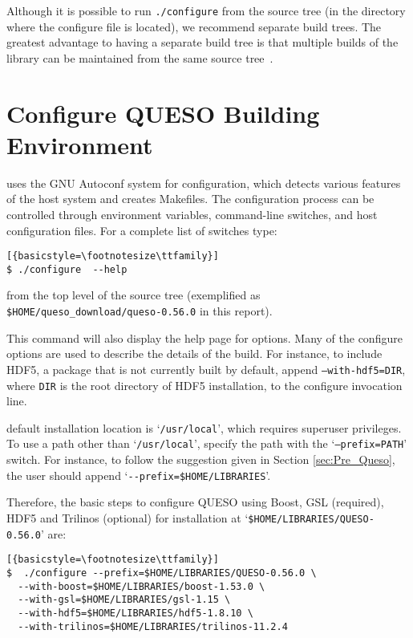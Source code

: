 Although it is possible to run \verb+./configure+ from the source tree (in the directory where the configure file is located), we recommend separate build trees. The greatest advantage to having a separate build tree is that multiple builds of the library
can be maintained from the same source tree~\cite{Trilinos}.


\section{Configure QUESO Building Environment}\label{sec:Queso_configure}

\Queso{} uses the GNU Autoconf system for configuration, which detects various features of the host system and creates Makefiles.
The configuration process can be controlled through environment variables, command-line switches, and host configuration files.
For a complete list of switches type:
\begin{lstlisting}[{basicstyle=\footnotesize\ttfamily}]
$ ./configure  --help
\end{lstlisting}
%
from the top level of the source tree (exemplified as \verb+$HOME/queso_download/queso-0.56.0+ in this report).

This command will also display the help page for \Queso{} options.  Many of the \Queso{} configure options are used to describe
the details of the build. For instance, to include HDF5, a package that is not currently built by default, append \texttt{--with-hdf5=DIR},
where \texttt{DIR} is the root directory of HDF5 installation,  to the configure invocation line.

\Queso{} default installation location is `\texttt{/usr/local}', which requires superuser privileges. To use a path
 other than `\texttt{/usr/local}', specify the path with the `\texttt{--prefix=PATH}' switch. For instance, to follow the suggestion
 given in Section \ref{sec:Pre_Queso}, the user should append `\verb+--prefix=$HOME/LIBRARIES+'.



Therefore, the basic steps to configure QUESO using Boost, GSL (required), HDF5 and Trilinos (optional) for installation at `\verb+$HOME/LIBRARIES/QUESO-0.56.0+' are:
\begin{lstlisting}[{basicstyle=\footnotesize\ttfamily}]
$  ./configure --prefix=$HOME/LIBRARIES/QUESO-0.56.0 \
  --with-boost=$HOME/LIBRARIES/boost-1.53.0 \
  --with-gsl=$HOME/LIBRARIES/gsl-1.15 \
  --with-hdf5=$HOME/LIBRARIES/hdf5-1.8.10 \
  --with-trilinos=$HOME/LIBRARIES/trilinos-11.2.4
  \end{lstlisting}

